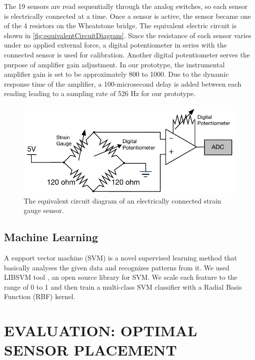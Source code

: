 \documentclass{sigchi}
\begin{document}
The 19 sensors are read sequentially through the analog switches, so each sensor is electrically connected at a time. Once a sensor is active, the sensor became one of the 4 resistors on the Wheatstone bridge. The equivalent electric circuit is shown in \autoref{fig:equivalentCircuitDiagram}. Since the resistance of each sensor varies under no applied external force, a digital potentiometer in series with the connected sensor is used for calibration. Another digital potentiometer serves the purpose of amplifier gain adjustment. In our prototype, the instrumental amplifier gain is set to be approximately 800 to 1000. Due to the dynamic response time of the amplifier, a 100-microsecond delay is added between each reading leading to a sampling rate of 526 Hz for our prototype.

\begin{figure}
  \begin{center}
  \includegraphics[width=1\columnwidth]{figures/EquivalentDiagram.pdf}
  \caption{The equivalent circuit diagram of an electrically connected strain gauge sensor.}
  \label{fig:equivalentCircuitDiagram}
  \end{center}
\end{figure}

\subsection{Machine Learning}
A support vector machine (SVM) is a novel supervised learning method that basically analyses the given data and recognizes patterns from it.
We used LIBSVM tool \cite{CC01a}, an open source library for SVM. 
We scale each feature to the range of 0 to 1 and then train a multi-class SVM classifier with a Radial Basis Function (RBF) kernel.

\section{EVALUATION: OPTIMAL SENSOR PLACEMENT}
\end{document}
